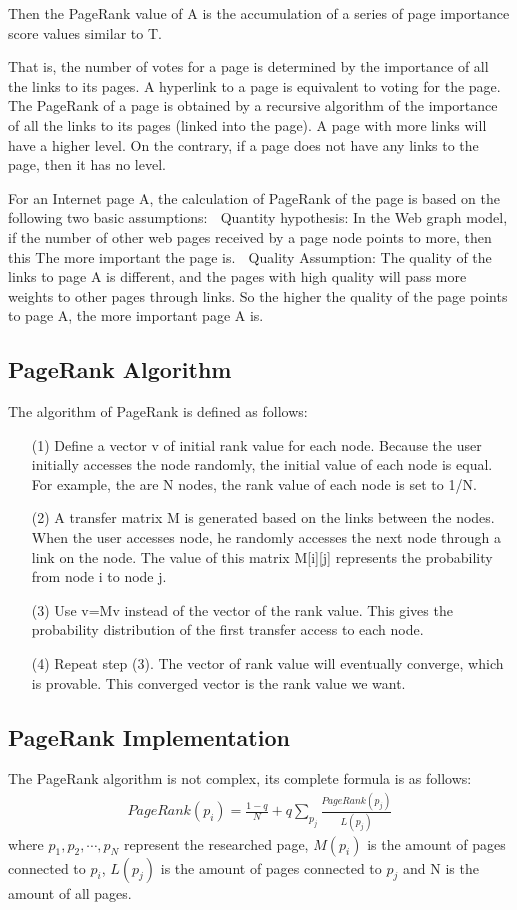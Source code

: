 \documentclass{acmtog} %
\begin{document}
Then the PageRank value of A is the accumulation of a series of page importance score values similar to T.

That is, the number of votes for a page is determined by the importance of all the links to its pages. A hyperlink to a page is equivalent to voting for the page. The PageRank of a page is obtained by a recursive algorithm of the importance of all the links to its pages (linked into the page). A page with more links will have a higher level. On the contrary, if a page does not have any links to the page, then it has no level.

For an Internet page A, the calculation of PageRank of the page is based on the following two basic assumptions:  Quantity hypothesis: In the Web graph model, if the number of other web pages received by a page node points to more, then this The more important the page is.  Quality Assumption: The quality of the links to page A is different, and the pages with high quality will pass more weights to other pages through links. So the higher the quality of the page points to page A, the more important page A is.
\subsection{PageRank Algorithm}
The algorithm of PageRank is defined as follows:
\begin{enumerate}
    \item [(1)]Define a vector v of initial rank value for each node. Because the user initially accesses the node randomly, the initial value of each node is equal. For example, the are N nodes, the rank value of each node is set to 1/N.
    \item [(2)]A transfer matrix M is generated based on the links between the nodes. When the user accesses node, he randomly accesses the next node through a link on the node. The value of this matrix M[i][j] represents the probability from node i to node j.
    \item [(3)] Use v=Mv instead of the vector of the rank value. This gives the probability distribution of the first transfer access to each node.
    \item [(4)] Repeat step (3). The vector of rank value will eventually converge, which is provable. This converged vector is the rank value we want.
\end{enumerate}
\subsection{PageRank Implementation}
The PageRank algorithm is not complex, its complete formula is as follows:
\begin{eqnarray}
  PageRank(p_i)=\frac{1-q}{N}+q\sum_{p_j}\frac{PageRank(p_j)}{L(p_j)}
  \label{eq:PageRank_formula}
\end{eqnarray}  
where $p_1,p_2,\cdots,p_N$ represent the researched page, $M(p_i)$ is the amount of pages connected to $p_i$, $L(p_j)$ is the amount of pages connected to $p_j$ and N is the amount of all pages.
\end{document}
